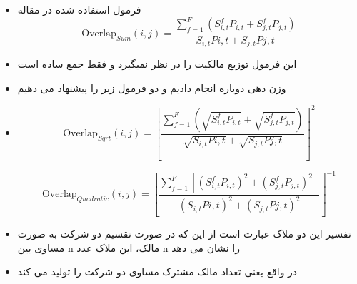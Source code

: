 
\begin{appendices}
\section{}
\label{ModifiedMeasure}
\begin{itemize}
	\item 
	فرمول استفاده شده در مقاله
		\begin{equation}
		\text{Overlap}_{Sum}(i, j) = \frac{\sum_{f = 1}^{F} (S^f_{i,t}P_{i,t}+S^f_{j,t}P_{j,t})}{S_{i,t}P{i,t} + S_{j,t}P{j,t}}
		\label{Sum}
	\end{equation}
	\item 
	این فرمول توزیع مالکیت را در نظر نمیگیرد و فقط جمع ساده است
	\item
وزن دهی دوباره انجام دادیم و دو فرمول زیر را پیشنهاد می دهیم	
	\item

\begin{equation}
	\text{Overlap}_{Sqrt}(i, j) =  [\frac{\sum_{f =1}^{F}(\sqrt{S^f_{i,t}P_{i,t}}+\sqrt{S^f_{j,t}P_{j,t}})}{\sqrt{S_{i,t}P{i,t}} + \sqrt{S_{j,t}P{j,t}}}]^2 
	\label{sqrt}
\end{equation}

\begin{equation}
	\text{Overlap}_{Quadratic}(i, j) =  [{\frac{\sum_{f = 1}^{F}[(S^f_{i,t}P_{i,t})^2+(S^f_{j,t}P_{j,t})^2]}{(S_{i,t}P{i,t})^2 + (S_{j,t}P{j,t})^2}}]^{-1}
	\label{Quadratic}
\end{equation}
	\item
تفسیر این دو ملاک عبارت است از این که در صورت تقسیم دو شرکت به صورت مساوی بین n مالک، این ملاک عدد n را نشان می دهد
	\item
در واقع یعنی تعداد مالک مشترک مساوی دو شرکت را تولید می کند
\end{itemize}


\end{appendices}
